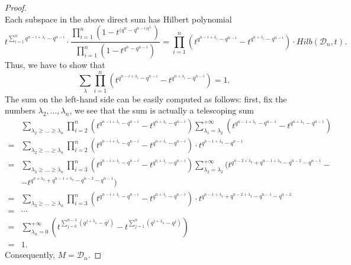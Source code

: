 \documentclass[12pt,a4paper]{report}
\theoremstyle{definition}
\theoremstyle{remark}
\theoremstyle{definition}
\begin{document}
\begin{proof}
\begin{equation*}
    \end{equation*}
    Each subspace in the above direct sum has Hilbert polynomial
    \begin{equation*}
        t^{\sum\limits_{i=1}^{n}q^{n-i+\lambda_i} - q^{n-i}}\cdot \dfrac{\prod\limits_{i=1}^{n}(1-t^{(q^n - q^{n-i)q^{\lambda_i}}})}{\prod\limits_{i=1}^{n}(1-t^{q^n - q^{n-i}})}=\prod\limits_{i=1}^{n}(t^{q^{n-i + \lambda_i} - q^{n-i}} - t^{q^{n+\lambda_i} - q^{n-i}})\cdot Hilb(\mathcal{D}_n, t).
    \end{equation*}
    Thus, we have to show that \begin{equation*}
        \sum\limits_{\lambda}\prod\limits_{i=1}^{n}(t^{q^{n-i + \lambda_i} - q^{n-i}} - t^{q^{n+\lambda_i} - q^{n-i}})=1.
    \end{equation*}
    The sum on the left-hand side can be easily computed as follows: first, fix the numbers $\lambda_2,\ldots, \lambda_{n}$, we see that the sum is actually a telescoping sum
    \begin{align*}
        &\sum\limits_{\lambda_2\geq \ldots\geq \lambda_n}\prod\limits_{i=2}^{n}(t^{q^{n-i + \lambda_i} - q^{n-i}} - t^{q^{n+\lambda_i} - q^{n-i}})\sum\limits_{\lambda_1 = \lambda_2}^{+\infty}(t^{q^{n-1 + \lambda_1} - q^{n-1}} - t^{q^{n+\lambda_1} - q^{n-1}})\\
      =& \sum\limits_{\lambda_2\geq \ldots\geq \lambda_n}\prod\limits_{i=2}^{n}(t^{q^{n-i + \lambda_i} - q^{n-i}} - t^{q^{n+\lambda_i} - q^{n-i}})\cdot t^{q^{n-1 + \lambda_2} - q^{n-1}}\\
      =&\sum\limits_{\lambda_3\geq \ldots\geq \lambda_n}\prod\limits_{i=3}^{n}(t^{q^{n-i + \lambda_i} - q^{n-i}} - t^{q^{n+\lambda_i} - q^{n-i}})\sum\limits_{\lambda_2 = \lambda_3}^{+\infty}(t^{q^{n-2 + \lambda_2} + q^{n-1 + \lambda_2} - q^{n-2} - q^{n-1}}- \\
      &-t^{q^{n+\lambda_2} + q^{n-1 + \lambda_2}- q^{n-2}- q^{n-1}})\\
      =&\sum\limits_{\lambda_3\geq \ldots\geq \lambda_n}\prod\limits_{i=3}^{n}(t^{q^{n-i + \lambda_i} - q^{n-i}} - t^{q^{n+\lambda_i} - q^{n-i}})\cdot t^{q^{n-1 + \lambda_3} + q^{n-2 + \lambda_3} - q^{n-1} - q^{n-2}}\\
      =&\cdots\\
      =& \sum\limits_{\lambda_n = 0}^{+\infty}\left(t^{\sum\limits_{j=0}^{n-1}(q^{j + \lambda_n} - q^j)} - t^{\sum\limits_{j=1}^{n}(q^{j + \lambda_n} - q^j)}\right)\\
      =& 1.
    \end{align*}
    Consequently, $M = \mathcal{D}_n$.
\end{proof}
\end{document}
